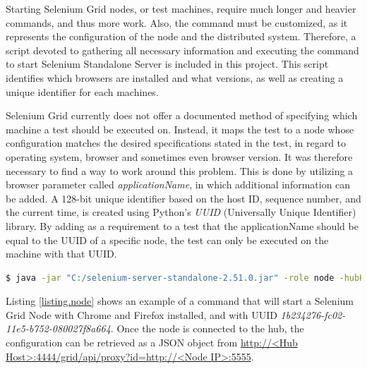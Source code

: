Starting Selenium Grid nodes, or test machines, require much longer and heavier commands, and thus more work. Also, the command must be customized, as it represents the configuration of the node and the distributed system. Therefore, a script devoted to gathering all necessary information and executing the command to start Selenium Standalone Server is included in this project. This script identifies which browsers are installed and what versions, as well as creating a unique identifier for each machines.

Selenium Grid currently does not offer a documented method of specifying which machine a test should be executed on. Instead, it maps the test to a node whose configuration matches the desired specifications stated in the test, in regard to operating system, browser and sometimes even browser version. It was therefore necessary to find a way to work around this problem. This is done by utilizing a browser parameter called \emph{applicationName}, in which additional information can be added. A 128-bit unique identifier based on the host ID, sequence number, and the current time, is created using Python's \emph{UUID} (Universally Unique Identifier) library. By adding as a requirement to a test that the applicationName should be equal to the UUID of a specific node, the test can only be executed on the machine with that UUID.

\vspace{4mm}
\noindent\begin{minipage}{\textwidth}
\begin{lstlisting}[caption=Sample Shell Command for Starting Selenium Grid Node, label={listing.node}, language=bash,   stringstyle={}]
$ java -jar "C:/selenium-server-standalone-2.51.0.jar" -role node -hubHost <HubHost> -uuid 1b234276-fc02-11e5-b752-080027f8a664 -browser "browserName=chrome, version=49.0.2623.110, applicationName=1b234276-fc02-11e5-b752-080027f8a664" -Dwebdriver.chrome.driver=path/to/chromedriver.exe -browser "browserName=firefox, version=45.0, applicationName=1b234276-fc02-11e5-b752-080027f8a664"
\end{lstlisting}
\end{minipage}

Listing \ref{listing.node} shows an example of a command that will start a Selenium Grid Node with Chrome and Firefox installed, and with UUID \emph{1b234276-fc02-11e5-b752-080027f8a664}. Once the node is connected to the hub, the configuration can be retrieved as a JSON object from \url{http://<Hub Host>:4444/grid/api/proxy?id=http://<Node IP>:5555}.

